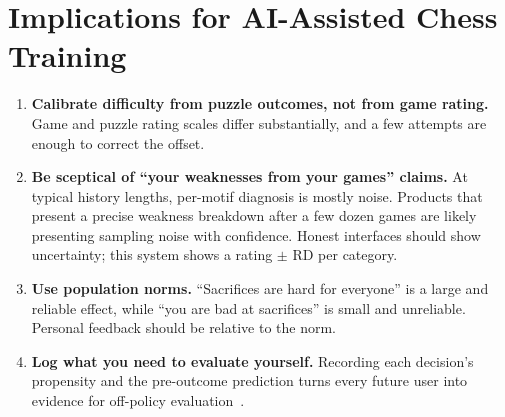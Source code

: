 \section{Implications for AI-Assisted Chess Training}

\begin{enumerate}
  \item \textbf{Calibrate difficulty from puzzle outcomes, not from game rating.} Game and puzzle
        rating scales differ substantially, and a few attempts are enough to correct the offset.
  \item \textbf{Be sceptical of ``your weaknesses from your games'' claims.} At typical history
        lengths, per-motif diagnosis is mostly noise. Products that present a precise weakness
        breakdown after a few dozen games are likely presenting sampling noise with confidence.
        Honest interfaces should show uncertainty; this system shows a rating $\pm$ RD per category.
  \item \textbf{Use population norms.} ``Sacrifices are hard for everyone'' is a large and reliable
        effect, while ``you are bad at sacrifices'' is small and unreliable. Personal feedback should be
        relative to the norm.
  \item \textbf{Log what you need to evaluate yourself.} Recording each decision's propensity and the
        pre-outcome prediction turns every future user into evidence for off-policy
        evaluation~\cite{nie2026discovering}.
\end{enumerate}
